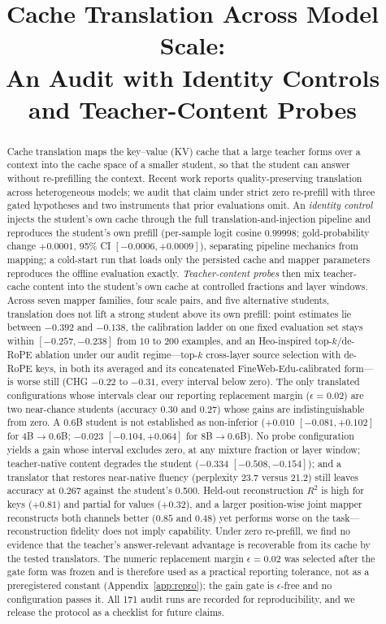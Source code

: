 \documentclass[10pt]{article}
\title{Cache Translation Across Model Scale:\\
An Audit with Identity Controls and Teacher-Content Probes}
\date{}
\begin{document}
\maketitle

\begin{abstract}
Cache translation maps the key--value (KV) cache that a large teacher forms
over a context into the cache space of a smaller student, so that the student
can answer without re-prefilling the context. Recent work reports
quality-preserving translation across heterogeneous models; we audit that claim
under strict zero re-prefill with three gated hypotheses and two instruments
that prior evaluations omit. An \emph{identity control} injects the student's
own cache through the full translation-and-injection pipeline and reproduces
the student's own prefill (per-sample logit cosine $0.99998$; gold-probability
change $+0.0001$, 95\% CI $[-0.0006, +0.0009]$), separating pipeline mechanics
from mapping; a cold-start run that loads only the persisted cache and mapper
parameters reproduces the offline evaluation exactly. \emph{Teacher-content probes} then mix teacher-cache content into the
student's own cache at controlled fractions and layer windows. Across seven
mapper families, four scale pairs, and five alternative students, translation
does not lift a strong student above its own
prefill: point estimates lie between $-0.392$ and $-0.138$, the calibration
ladder on one fixed evaluation set stays within $[-0.257, -0.238]$ from $10$ to
$200$ examples, and an Heo-inspired top-$k$/de-RoPE ablation under our audit regime---top-$k$ cross-layer source selection with
de-RoPE keys, in both its averaged and its concatenated FineWeb-Edu-calibrated form---is worse still (CHG $-0.22$ to $-0.31$, every interval below zero).
The only translated configurations whose intervals clear our reporting replacement margin ($\epsilon{=}0.02$) are two near-chance students (accuracy
$0.30$ and $0.27$) whose gains are indistinguishable from zero. A 0.6B student is not established as
non-inferior ($+0.010$ $[-0.081, +0.102]$ for 4B$\to$0.6B; $-0.023$
$[-0.104, +0.064]$ for 8B$\to$0.6B). No probe configuration yields a gain whose
interval excludes zero, at any mixture fraction or layer window; teacher-native
content degrades the student ($-0.334$ $[-0.508, -0.154]$); and a translator
that restores near-native fluency (perplexity 23.7 versus 21.2) still leaves
accuracy at 0.267 against the student's 0.500. Held-out reconstruction $R^2$ is
high for keys ($+0.81$) and partial for values ($+0.32$), and a larger
position-wise joint mapper reconstructs both channels better ($0.85$ and $0.48$)
yet performs worse on the task---reconstruction fidelity does not imply
capability. Under zero
re-prefill, we find no evidence that the teacher's answer-relevant advantage is
recoverable from its cache by the tested translators. The numeric replacement margin $\epsilon{=}0.02$ was selected after the gate form was frozen and is therefore used as a practical reporting tolerance, not as a preregistered constant (Appendix~\ref{app:repro}); the gain gate is $\epsilon$-free and no configuration passes it. All 171 audit runs are
recorded for reproducibility, and we release the protocol as a checklist for
future claims.
\end{abstract}
\end{document}
